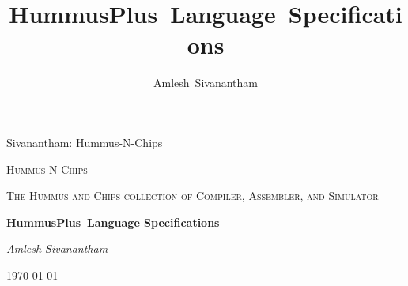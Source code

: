 \documentclass[12pt,journal,compsoc]{article}
\begin{document}
\title{HummusPlus~Language~Specifications}
\author{Amlesh~Sivanantham}
\date{}

{Sivanantham: Hummus-N-Chips}




\begin{titlepage}
  \begin{center}
    \vfill
    {\scshape\LARGE Hummus-N-Chips \par}
    \vspace{1cm}
    {\scshape\Large The Hummus and Chips collection of Compiler, Assembler, 
                    and Simulator\par}
    \vspace{1.5cm}
    {\huge\bfseries HummusPlus~Language Specifications\par}
    \vspace{2cm}
    {\Large\itshape Amlesh Sivanantham\par}
    \vspace{1cm}
    {\large \today\par}
  \end{center}
\end{titlepage}

\clearpage

\maketitle
\end{document}
